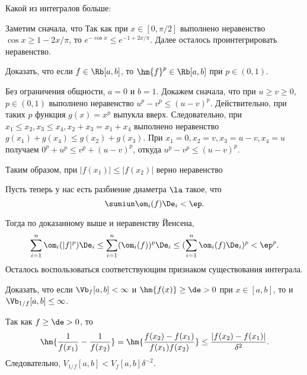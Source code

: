 \documentclass[a4paper]{article}
\begin{document}
\begin{problem}
Какой из интегралов больше:
\end{problem}
\begin{solution}
Заметим сначала, что
Так как при $x\in [0,\pi/2]$ выполнено неравенство $\cos x\ge 1-2x/\pi$,
то $e^{-\cos x}\le e^{-1+2x/\pi}$. Далее осталось проинтегрировать неравенство.
\end{solution}

\begin{problem}
Доказать, что если $f \in\Rb[a,b]$, то $\hm{f}^p \in \Rb[a,b]$ при $ p \in (0,1)$.
\end{problem}
\begin{solution}
Без ограничения общности, $a=0$ и $b=1$. Докажем сначала, что при $u\ge v\ge 0$, $p \in (0,1)$ выполнено
неравенство $ u^p-v^p\le (u-v)^p$. Действительно, при таких $p$ функция $g(x)=x^p$ выпукла вверх.
Следовательно, при $x_1\le x_2, x_3\le x_4, x_2+x_3=x_1+x_4$ выполнено неравенство $g(x_1)+g(x_4)\le
g(x_2)+g(x_3)$. При $x_1=0, x_2=v, x_3=u-v,x_4=u$ получаем $0^p+u^p\le v^p+(u-v)^p$, откуда $u^p-v^p\le
(u-v)^p$.

Таким образом, при $|f(x_1)|\le|f(x_2)|$ верно неравенство

Пусть теперь у нас есть разбиение диаметра $\la$ такое, что $$ \sumiun \om_i(f)\De_i<\ep.$$

Тогда по доказанному выше и неравенству Йенсена,
$$\sum_{i=1}^n\om_i(|f|^p)\De_i\le \sum_{i=1}^n(\om_i(f))^p\De_i\le (\sum_{i=1}^n\om_i(f)\De_i)^p<\ep^p.$$
Осталось воспользоваться соответствующим признаком существования интеграла.
\end{solution}

\begin{problem}
Доказать, что если $\Vb_f[a,b] < \infty$ и $\hm{f(x)} \ge \de > 0$ при $x \in [a,b]$, то и $\Vb_{1/f}[a,b]
\le \infty$.
\end{problem}
\begin{solution}
Так как $f\ge\de>0$, то
$$\hm{\frac{1}{f(x_1)}-\frac{1}{f(x_2)}}=\hm{\frac{f(x_2)-f(x_1)}{f(x_1)f(x_2)}} \le \frac{|f(x_2)-f(x_1)|}{\delta^2}.$$
Следовательно, $V_{1/f}[a,b]<V_f[a,b]\delta^{-2}.$
\end{solution}
\end{document}
